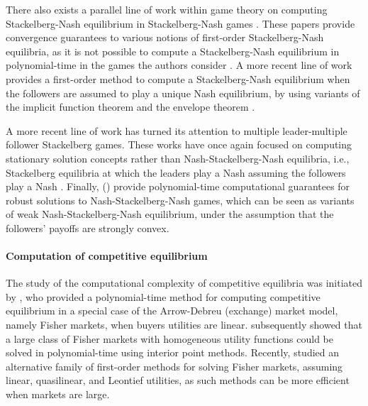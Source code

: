 There also exists a parallel line of work within game theory on computing Stackelberg-Nash equilibrium in Stackelberg-Nash games \cite{nakamura2015one, liu1998stackelberg}.
These papers provide convergence guarantees to various notions of first-order Stackelberg-Nash equilibria, as it is not possible to compute a Stackelberg-Nash equilibrium in polynomial-time in the games the authors consider \cite{basilico2020bilevel, coniglio2020computing}.
A more recent line of work provides a first-order method to compute a Stackelberg-Nash equilibrium when the followers are assumed   to play a unique Nash equilibrium, by using variants of the implicit function theorem and the envelope theorem \cite{li2020end, li2022solving, sinha2019using, wang2022coordinating}.

A more recent line of work has turned its attention to multiple leader-multiple follower Stackelberg games.
These works have once again focused on computing stationary solution concepts rather than Nash-Stackelberg-Nash equilibria,  i.e., Stackelberg equilibria at which the leaders play a Nash assuming the followers play a Nash \cite{solis2016modeling, sinha2014finding}. 
Finally, \citeauthor{gu2023min} (\citeyear{gu2023min}) provide polynomial-time computational guarantees for robust solutions to %
Nash-Stackelberg-Nash games, which can be seen as variants of weak Nash-Stackelberg-Nash equilibrium, under the assumption that the followers' payoffs are strongly convex.


\paragraph{Computation of competitive equilibrium}
The study of the computational complexity of competitive equilibria was initiated by \citet{devanur2002market}, who provided a polynomial-time method for computing competitive equilibrium in a special case of the Arrow-Debreu (exchange) market model, namely Fisher markets, when buyers utilities are linear.
\citet{jain2005market} subsequently showed that a large class of Fisher markets with homogeneous utility functions could be solved in polynomial-time using interior point methods.
Recently, \citet{gao2020polygm} studied an alternative family of first-order methods for solving Fisher markets, assuming linear, quasilinear, and Leontief utilities, as such methods can be more efficient when markets are large.

